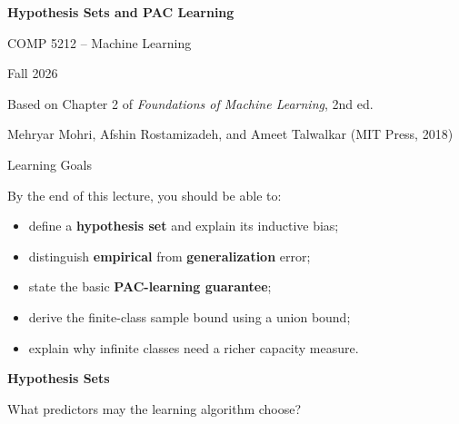 \documentclass[aspectratio=169,10pt]{beamer}
\newcommand{\SectionSlide}[2]{%
  \begin{frame}
    \centering
    \vfill
    {\color{slideorange}\fontsize{29}{34}\selectfont\bfseries #1\par}
    \vspace{0.38cm}
    {\color{midgray}\fontsize{16}{21}\selectfont #2\par}
    \vfill
  \end{frame}
}
\begin{document}
\begin{frame}
  \centering
  \vspace*{0.88cm}
  {\fontsize{34}{40}\selectfont\bfseries Hypothesis Sets and PAC Learning\par}
  \vspace{0.45cm}
  {\fontsize{16}{20}\selectfont COMP 5212 -- Machine Learning\par}
  \vspace{0.18cm}
  {\fontsize{15}{19}\selectfont Fall 2026\par}
  \vspace{0.86cm}
  {\fontsize{14}{18}\selectfont
  Based on Chapter 2 of \emph{Foundations of Machine Learning}, 2nd ed.\par}
  \vfill
  {\small Mehryar Mohri, Afshin Rostamizadeh, and Ameet Talwalkar (MIT Press, 2018)\par}
\end{frame}

\begin{frame}[t]{Learning Goals}
  \vspace{0.12cm}
  {\fontsize{14.5}{18}\selectfont
  By the end of this lecture, you should be able to:
  \begin{itemize}
    \setlength{\itemsep}{0.18cm}
    \item define a \textbf{hypothesis set} and explain its inductive bias;
    \item distinguish \textbf{empirical} from \textbf{generalization} error;
    \item state the basic \textbf{PAC-learning guarantee};
    \item derive the finite-class sample bound using a union bound;
    \item explain why infinite classes need a richer capacity measure.
  \end{itemize}}
\end{frame}

\SectionSlide{Hypothesis Sets}{What predictors may the learning algorithm choose?}
\end{document}
